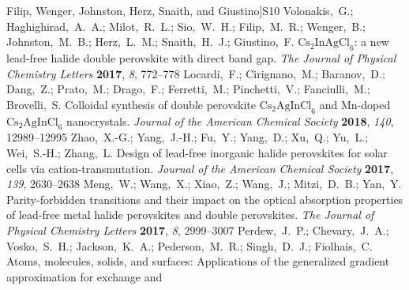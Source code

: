 \documentclass[journal=jpclcd,manuscript=letter]{achemso}
\begin{document}
\begin{mcitethebibliography}{49}
  Filip, Wenger, Johnston, Herz, Snaith, and Giustino]{S10}
Volonakis,~G.; Haghighirad,~A.~A.; Milot,~R.~L.; Sio,~W.~H.; Filip,~M.~R.;
  Wenger,~B.; Johnston,~M.~B.; Herz,~L.~M.; Snaith,~H.~J.; Giustino,~F.
  ${\mathrm{Cs}}_{2}{\mathrm{InAgCl}}_{6}$: a new lead-free halide double
  perovskite with direct band gap. \emph{The Journal of Physical Chemistry
  Letters} \textbf{2017}, \emph{8}, 772--778\relax
\mciteBstWouldAddEndPuncttrue
\mciteSetBstMidEndSepPunct{\mcitedefaultmidpunct}
{\mcitedefaultendpunct}{\mcitedefaultseppunct}\relax
\EndOfBibitem
{}
Locardi,~F.; Cirignano,~M.; Baranov,~D.; Dang,~Z.; Prato,~M.; Drago,~F.;
  Ferretti,~M.; Pinchetti,~V.; Fanciulli,~M.; Brovelli,~S. 
  Colloidal synthesis of double perovskite
  ${\mathrm{Cs}}_{2}{\mathrm{AgInCl}}_{6}$ and Mn-doped
  ${\mathrm{Cs}}_{2}{\mathrm{AgInCl}}_{6}$ nanocrystals. \emph{Journal of the
  American Chemical Society} \textbf{2018}, \emph{140}, 12989--12995\relax
\mciteBstWouldAddEndPuncttrue
\mciteSetBstMidEndSepPunct{\mcitedefaultmidpunct}
{\mcitedefaultendpunct}{\mcitedefaultseppunct}\relax
\EndOfBibitem
{}
Zhao,~X.-G.; Yang,~J.-H.; Fu,~Y.; Yang,~D.; Xu,~Q.; Yu,~L.; Wei,~S.-H.;
  Zhang,~L. Design of lead-free inorganic halide perovskites for solar cells
  via cation-transmutation. \emph{Journal of the American Chemical Society}
  \textbf{2017}, \emph{139}, 2630--2638\relax
\mciteBstWouldAddEndPuncttrue
\mciteSetBstMidEndSepPunct{\mcitedefaultmidpunct}
{\mcitedefaultendpunct}{\mcitedefaultseppunct}\relax
\EndOfBibitem
{}
Meng,~W.; Wang,~X.; Xiao,~Z.; Wang,~J.; Mitzi,~D.~B.; Yan,~Y. Parity-forbidden
  transitions and their impact on the optical absorption properties of
  lead-free metal halide perovskites and double perovskites. \emph{The Journal
  of Physical Chemistry Letters} \textbf{2017}, \emph{8}, 2999--3007\relax
\mciteBstWouldAddEndPuncttrue
\mciteSetBstMidEndSepPunct{\mcitedefaultmidpunct}
{\mcitedefaultendpunct}{\mcitedefaultseppunct}\relax
\EndOfBibitem
{}
Perdew,~J.~P.; Chevary,~J.~A.; Vosko,~S.~H.; Jackson,~K.~A.; Pederson,~M.~R.;
  Singh,~D.~J.; Fiolhais,~C. Atoms, molecules, solids, and surfaces:
  Applications of the generalized gradient approximation for exchange and

\end{mcitethebibliography}
\end{document}

